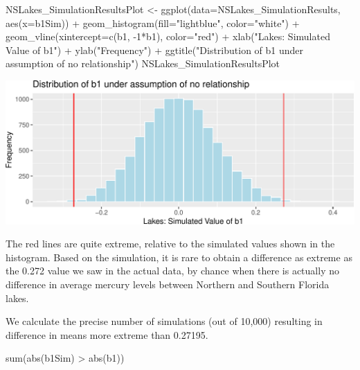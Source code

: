 \documentclass[
  letterpaper,
  DIV=11,
  numbers=noendperiod]{scrreprt}
\newenvironment{Shaded}{\begin{snugshade}}{\end{snugshade}}
\newcommand{\AttributeTok}[1]{\textcolor[rgb]{0.40,0.45,0.13}{#1}}
\newcommand{\DecValTok}[1]{\textcolor[rgb]{0.68,0.00,0.00}{#1}}
\newcommand{\FunctionTok}[1]{\textcolor[rgb]{0.28,0.35,0.67}{#1}}
\newcommand{\NormalTok}[1]{\textcolor[rgb]{0.00,0.23,0.31}{#1}}
\newcommand{\OtherTok}[1]{\textcolor[rgb]{0.00,0.23,0.31}{#1}}
\newcommand{\SpecialCharTok}[1]{\textcolor[rgb]{0.37,0.37,0.37}{#1}}
\newcommand{\StringTok}[1]{\textcolor[rgb]{0.13,0.47,0.30}{#1}}
\begin{document}
\begin{Shaded}
\begin{Highlighting}[]
\NormalTok{NSLakes\_SimulationResultsPlot }\OtherTok{\textless{}{-}} \FunctionTok{ggplot}\NormalTok{(}\AttributeTok{data=}\NormalTok{NSLakes\_SimulationResults, }
                                        \FunctionTok{aes}\NormalTok{(}\AttributeTok{x=}\NormalTok{b1Sim)) }\SpecialCharTok{+} 
  \FunctionTok{geom\_histogram}\NormalTok{(}\AttributeTok{fill=}\StringTok{"lightblue"}\NormalTok{, }\AttributeTok{color=}\StringTok{"white"}\NormalTok{) }\SpecialCharTok{+} 
  \FunctionTok{geom\_vline}\NormalTok{(}\AttributeTok{xintercept=}\FunctionTok{c}\NormalTok{(b1, }\SpecialCharTok{{-}}\DecValTok{1}\SpecialCharTok{*}\NormalTok{b1), }\AttributeTok{color=}\StringTok{"red"}\NormalTok{) }\SpecialCharTok{+} 
  \FunctionTok{xlab}\NormalTok{(}\StringTok{"Lakes: Simulated Value of b1"}\NormalTok{) }\SpecialCharTok{+} \FunctionTok{ylab}\NormalTok{(}\StringTok{"Frequency"}\NormalTok{) }\SpecialCharTok{+} 
  \FunctionTok{ggtitle}\NormalTok{(}\StringTok{"Distribution of b1 under assumption of no relationship"}\NormalTok{)}
\NormalTok{NSLakes\_SimulationResultsPlot}
\end{Highlighting}
\end{Shaded}

\includegraphics{Ch3_files/figure-pdf/unnamed-chunk-202-1.pdf}

The red lines are quite extreme, relative to the simulated values shown
in the histogram. Based on the simulation, it is rare to obtain a
difference as extreme as the 0.272 value we saw in the actual data, by
chance when there is actually no difference in average mercury levels
between Northern and Southern Florida lakes.

We calculate the precise number of simulations (out of 10,000) resulting
in difference in means more extreme than 0.27195.

\begin{Shaded}
\begin{Highlighting}[]
\FunctionTok{sum}\NormalTok{(}\FunctionTok{abs}\NormalTok{(b1Sim) }\SpecialCharTok{\textgreater{}} \FunctionTok{abs}\NormalTok{(b1))}
\end{Highlighting}
\end{Shaded}
\end{document}
